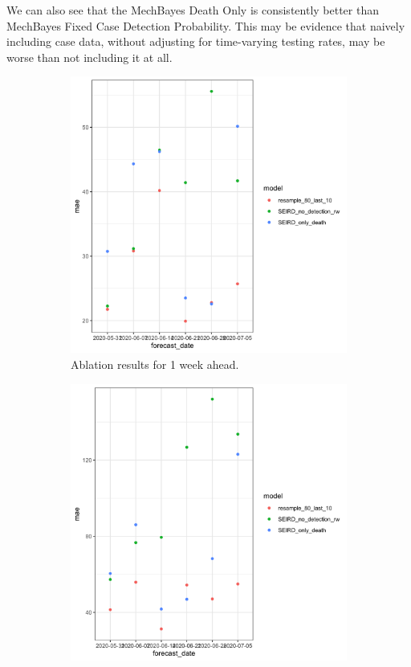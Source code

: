 \documentclass[11pt]{amsart}
\begin{document}
We can also see that the MechBayes Death Only is consistently better than MechBayes Fixed Case Detection Probability.  This may be evidence that naively including case data, without adjusting for time-varying testing rates, may be worse than not including it at all. 

\begin{figure}
  \centering
     \begin{subfigure}{.5\textwidth}
  \centering
    \includegraphics[scale=.15]{ablation_1.png}
    \caption{Ablation results for 1 week ahead.}
\end{subfigure}%
\begin{subfigure}{.5\textwidth}
  \centering
    \includegraphics[scale=.15]{ablation_2.png}

\end{subfigure}
\end{figure}
\end{document}
